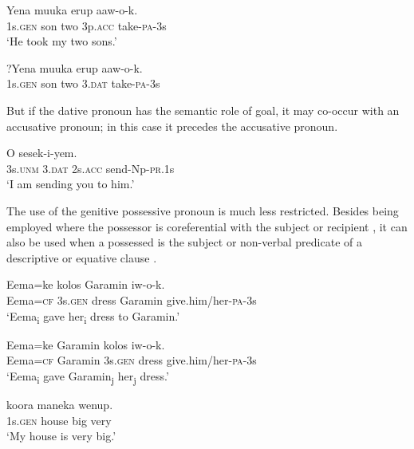 \ea%
\label{ex:3:x583}
\gll Yena muuka erup  aaw-o-k. \\
1s.\textsc{gen} son two 3p.\textsc{acc} take-\textsc{pa}-3s\\
\glt`He took my two sons.'
\z

\ea%
\label{ex:3:x1928}
\gll ?Yena muuka erup  aaw-o-k. \\
1s.\textsc{gen} son two 3.\textsc{dat} take-\textsc{pa}-3s\\
\glt %
\z

But if the dative pronoun has the semantic role of goal, it may co-occur with an accusative pronoun; in this case it precedes the accusative pronoun.

\ea%
\label{ex:3:x1576}
\gll O   sesek-i-yem. \\
3s.\textsc{unm} 3.\textsc{dat} 2s.\textsc{acc} send-Np-\textsc{pr}.1s\\
\glt`I am sending you to him.'
\z

The use of the genitive possessive pronoun is much less restricted. Besides being employed where the possessor is coreferential with the subject  or recipient , it can also be used when a possessed  is the subject or non-verbal predicate of a descriptive or equative clause . 

\ea%
\label{ex:3:x589}
\gll Eema=ke  kolos Garamin iw-o-k. \\
Eema=\textsc{cf} 3s.\textsc{gen} dress Garamin give.him/her-\textsc{pa}-3s\\
\glt`Eema\textsubscript{i} gave her\textsubscript{i} dress to Garamin.'
\z

\ea%
\label{ex:3:x590}
\gll Eema=ke Garamin  kolos iw-o-k. \\
Eema=\textsc{cf} Garamin 3s.\textsc{gen} dress give.him/her-\textsc{pa}-3s\\
\glt`Eema\textsubscript{i} gave Garamin\textsubscript{j} her\textsubscript{j} dress.'
\z

\ea%
\label{ex:3:x591}
\gll {} koora maneka wenup. \\
1s.\textsc{gen} house big very\\
\glt`My house is very big.'
\z

